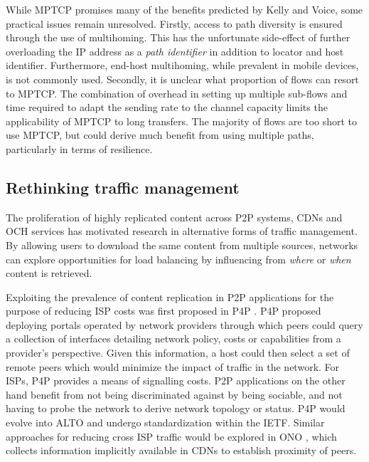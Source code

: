 While \ac{MPTCP} promises many of the benefits predicted by Kelly and Voice, some practical issues remain unresolved.
Firstly, access to path diversity is ensured through the use of multihoming. 
This has the unfortunate side-effect of further overloading the \ac{IP} address as a \emph{path identifier} in addition to locator and host identifier.
Furthermore, end-host multihoming, while prevalent in mobile devices, is not commonly used.
Secondly, it is unclear what proportion of flows can resort to \ac{MPTCP}.
The combination of overhead in setting up multiple sub-flows and time required to adapt the sending rate to the channel capacity limits the applicability of \ac{MPTCP} to long transfers.
The majority of flows are too short to use \ac{MPTCP}, but could derive much benefit from using multiple paths, particularly in terms of resilience.

\subsection{Rethinking traffic management}
The proliferation of highly replicated content across \ac{P2P} systems, \acp{CDN} and \ac{OCH} services has motivated research in alternative forms of traffic management.
By allowing users to download the same content from multiple sources, networks can explore opportunities for load balancing by influencing from \emph{where} or \emph{when} content is retrieved.

Exploiting the prevalence of content replication in \ac{P2P} applications for the purpose of reducing \ac{ISP} costs was first proposed in \ac{P4P} \cite{Xie:2008p531}.
\ac{P4P} proposed deploying portals operated by network providers through which peers could query a collection of interfaces detailing network policy, costs or capabilities from a provider's perspective. 
Given this information, a host could then select a set of remote peers which would minimize the impact of traffic in the network.
For \acp{ISP}, \ac{P4P} provides a means of signalling costs.
\ac{P2P} applications on the other hand benefit from not being discriminated against by being sociable, and not having to probe the network to derive network topology or status.
\ac{P4P} would evolve into \ac{ALTO} and undergo standardization within the \ac{IETF}.
Similar approaches for reducing cross \ac{ISP} traffic would be explored in ONO \cite{Choffnes:2008p532}, which collects information implicitly available in \acp{CDN} to establish proximity of peers.

